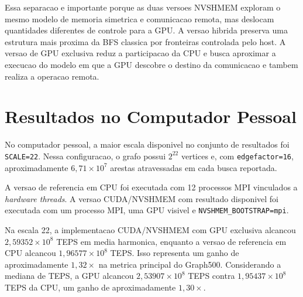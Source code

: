 Essa separacao e importante porque as duas versoes NVSHMEM exploram o mesmo modelo
de memoria simetrica e comunicacao remota, mas deslocam quantidades diferentes de
controle para a GPU. A versao hibrida preserva uma estrutura mais proxima da BFS
classica por fronteiras controlada pelo host. A versao de GPU exclusiva reduz a
participacao da CPU e busca aproximar a execucao do modelo em que a GPU descobre o
destino da comunicacao e tambem realiza a operacao remota.

\section{Resultados no Computador Pessoal}

No computador pessoal, a maior escala disponivel no conjunto de resultados foi
\texttt{SCALE=22}. Nessa configuracao, o grafo possui $2^{22}$ vertices e, com
\texttt{edgefactor=16}, aproximadamente $6{,}71 \times 10^{7}$ arestas
atravessadas em cada busca reportada.

A versao de referencia em CPU foi executada com 12 processos MPI vinculados a
\textit{hardware threads}. A versao CUDA/NVSHMEM com resultado disponivel foi
executada com um processo MPI, uma GPU visivel e
\texttt{NVSHMEM\_BOOTSTRAP=mpi}.

\begin{table}[H]
\centering
{}
\caption{Resultados no computador pessoal na maior escala disponivel. TEPS \(H\) e a media harmonica de TEPS reportada pelo Graph500. A medicao da versao hibrida CPU/GPU ainda esta pendente.}
\label{tab:resultados-pc}
\end{table}

Na escala 22, a implementacao CUDA/NVSHMEM com GPU exclusiva alcancou $2{,}59352
\times 10^{8}$ TEPS em media harmonica, enquanto a versao de referencia em CPU
alcancou $1{,}96577 \times 10^{8}$ TEPS. Isso representa um ganho de
aproximadamente $1{,}32\times$ na metrica principal do Graph500. Considerando a
mediana de TEPS, a GPU alcancou $2{,}53907 \times 10^{8}$ TEPS contra $1{,}95437
\times 10^{8}$ TEPS da CPU, um ganho de aproximadamente $1{,}30\times$.


